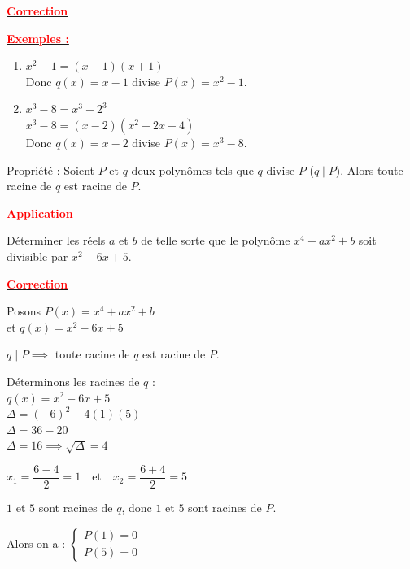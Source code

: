 \documentclass[12pt,a4paper]{article}
\begin{document}
\begin{center}
    \textbf{\underline{\textcolor{red}{Correction}}}
\end{center}

\textbf{\underline{\textcolor{red}{Exemples :}}}
\begin{enumerate}
    \item $x^2 - 1 = (x - 1)(x + 1)$ \\
    Donc $q(x) = x - 1$ divise $P(x) = x^2 - 1$.
    \item $x^3 - 8 = x^3 - 2^3$ \\
    $x^3 - 8 = (x - 2)(x^2 + 2x + 4)$ \\
    Donc $q(x) = x - 2$ divise $P(x) = x^3 - 8$.
\end{enumerate}

\noindent \underline{Propriété :} Soient $P$ et $q$ deux polynômes tels que $q$ divise $P$ ($q \mid P$). Alors toute racine de $q$ est racine de $P$.

\vspace{1cm}

\begin{center}
    \textbf{\underline{\textcolor{red}{Application}}}
\end{center}

\noindent Déterminer les réels $a$ et $b$ de telle sorte que le polynôme $x^4 + ax^2 + b$ soit divisible par $x^2 - 6x + 5$.

\begin{center}
    \textbf{\underline{\textcolor{red}{Correction}}}
\end{center}

Posons $P(x) = x^4 + ax^2 + b$ \\
et $q(x) = x^2 - 6x + 5$

$q \mid P \implies$ toute racine de $q$ est racine de $P$.

Déterminons les racines de $q$ : \\
$q(x) = x^2 - 6x + 5$ \\
$\Delta = (-6)^2 - 4(1)(5)$ \\
$\Delta = 36 - 20$ \\
$\Delta = 16 \implies \sqrt{\Delta} = 4$

$x_1 = \dfrac{6 - 4}{2} = 1 \quad \text{et} \quad x_2 = \dfrac{6 + 4}{2} = 5$

$1$ et $5$ sont racines de $q$, donc $1$ et $5$ sont racines de $P$.

Alors on a : 
$\begin{cases} P(1) = 0 \\ P(5) = 0 \end{cases}$
\end{document}
